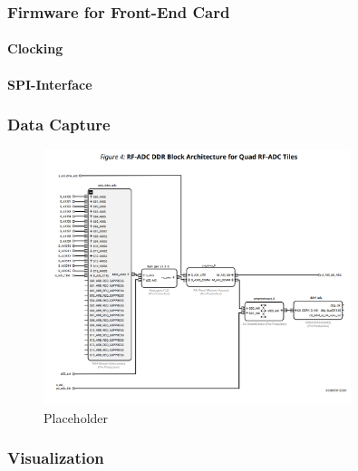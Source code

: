 \subsubsection{Firmware for Front-End Card}
\paragraph{Clocking}
\paragraph{SPI-Interface}
\subsubsection{Data Capture}
\begin{figure}[H]
	\centering
	\includegraphics[width = 0.8\textwidth]{chap/03-work/img/adc_cap}
	\caption{Placeholder}
	\label{fig:adccap}
\end{figure}

\subsubsection{Visualization}





